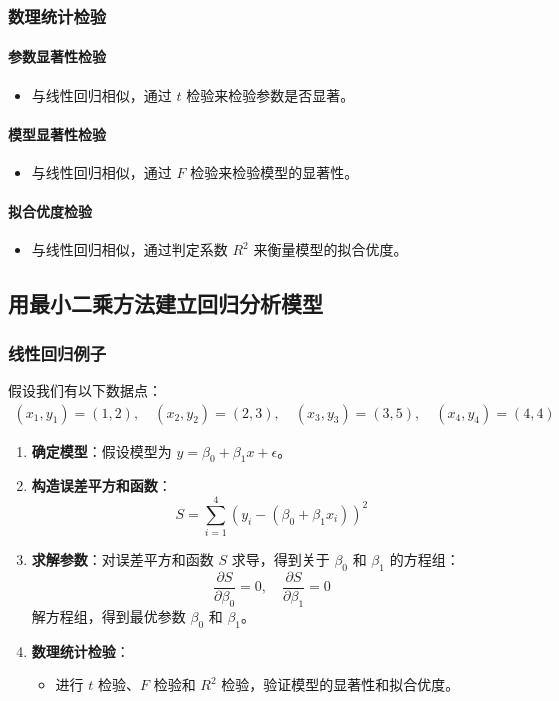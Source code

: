\documentclass[UTF8]{ctexart}
\begin{document}
\subsubsection {数理统计检验}
\paragraph{参数显著性检验}
\begin{itemize}
    \item 与线性回归相似，通过 \(t\) 检验来检验参数是否显著。
\end{itemize}

\paragraph{模型显著性检验}
\begin{itemize}
    \item 与线性回归相似，通过 \(F\) 检验来检验模型的显著性。
\end{itemize}

\paragraph{拟合优度检验}
\begin{itemize}
    \item 与线性回归相似，通过判定系数 \(R^2\) 来衡量模型的拟合优度。
\end{itemize}

\subsection {用最小二乘方法建立回归分析模型}
\subsubsection {线性回归例子}
假设我们有以下数据点：
\[
\begin{aligned}
(x_1, y_1) = (1, 2), \quad (x_2, y_2) = (2, 3), \quad (x_3, y_3) = (3, 5), \quad (x_4, y_4) = (4, 4)
\end{aligned}
\]
\begin{enumerate}
    \item \textbf{确定模型}：假设模型为 \( y = \beta_0 + \beta_1 x + \epsilon \)。
    \item \textbf{构造误差平方和函数}：
    \[
    S = \sum_{i=1}^{4} (y_i - (\beta_0 + \beta_1 x_i))^2
    \]
    \item \textbf{求解参数}：对误差平方和函数 \( S \) 求导，得到关于 \(\beta_0\) 和 \(\beta_1\) 的方程组：
    \[
    \frac{\partial S}{\partial \beta_0} = 0, \quad \frac{\partial S}{\partial \beta_1} = 0
    \]
    解方程组，得到最优参数 \(\beta_0\) 和 \(\beta_1\)。
    \item \textbf{数理统计检验}：
        \begin{itemize}
            \item 进行 \(t\) 检验、\(F\) 检验和 \(R^2\) 检验，验证模型的显著性和拟合优度。
        \end{itemize}
\end{enumerate}
\end{document}
